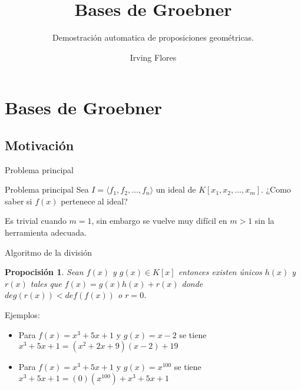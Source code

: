 \documentclass[10pt]{beamer}
\author{Irving Flores}
\institute{ESFM del IPN}
\title{Bases de Groebner}
\subtitle{Demostración automatica de proposiciones geométricas.}
\newtheorem{prop}{Propocisión}
\newcommand{\gen}[1]{\ensuremath{\langle #1\rangle}}
\begin{document}
\begin{frame}
\titlepage
\end{frame}

\begin{frame}
\tableofcontents
\end{frame}

\section{Bases de Groebner}
\subsection{Motivación}

\begin{frame}{Problema principal}

	\begin{block}{Problema principal}
		Sea $I = \gen{f_1,f_2,\ldots, f_n}$ un ideal de $K[x_1,x_2,\ldots, x_m]$.
		¿Como saber si $f(x)$ pertenece al ideal?
	\end{block}

	\pause
	Es trivial cuando $m=1$, sin embargo se vuelve muy difícil en $m>1$ sin la herramienta adecuada.
\end{frame}


\begin{frame}{Algoritmo de la división}

	\begin{prop}
		Sean $f(x)$ y $g(x)\in K[x]$ entonces existen únicos $h(x)$ y $r(x)$ tales que $f(x) = g(x)h(x)+r(x)$ donde $deg(r(x)) < def(f(x))$ o $r = 0$.
	\end{prop}

	\pause
	Ejemplos:

	\begin{itemize}
		\item Para $f(x)=x^3+5x+1$ y $g(x)=x-2$ se tiene $x^3+5x+1 = (x^2+2x+9)(x-2) + 19$
		\item Para $f(x)=x^3+5x+1$ y $g(x)=x^100$ se tiene $x^3+5x+1 = (0)(x^100) + x^3+5x+1$
	\end{itemize}

\end{frame}
\end{document}
